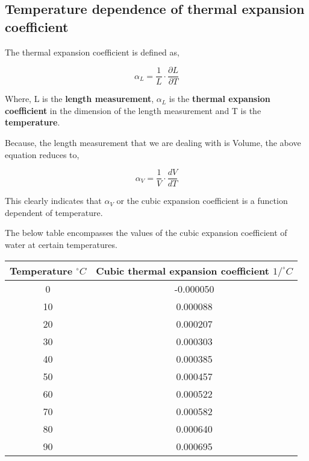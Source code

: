 
\subsection{{Temperature dependence of thermal expansion \\ coefficient}}

	{The thermal expansion coefficient is defined as,}
	
		$$\alpha_{L} = \frac{1}{L}\cdot\frac{\partial L}{\partial T}$$
	
	{Where, L is the \textbf{length measurement}, $\alpha_{L}$ is the \textbf{thermal expansion coefficient} in the dimension of the length measurement and T is the \textbf{temperature}.}	
	
	{Because, the length measurement that we are dealing with is Volume, the above equation reduces to,}

		$$\alpha_{V} = \frac{1}{V}\cdot\frac{dV}{dT}$$
	
	{This clearly indicates that $\alpha_{V}$ or the cubic expansion coefficient is a function dependent of temperature.}	
	
	{The below table encompasses the values of the cubic expansion coefficient of water at certain temperatures.}	
	
	\begin{table}[H]
		\centering
		\begin{tabular}{|c|c|}
		\hline
		\hline
		{Temperature $^\circ C$} & {Cubic thermal expansion coefficient $1/^\circ C$} \\
		\hline
		\hline
		0 & -0.000050 \\
		\hline		
		10 & 0.000088 \\
		\hline
		20 & 0.000207 \\
		\hline
		30 & 0.000303 \\
		\hline
		40 & 0.000385 \\
		\hline
		50 & 0.000457 \\
		\hline
		60 & 0.000522 \\
		\hline
		70 & 0.000582 \\
		\hline
		80 & 0.000640 \\
		\hline
		90 & 0.000695 \\
		\hline
		\hline 
		\end{tabular}
	
	\end{table}

